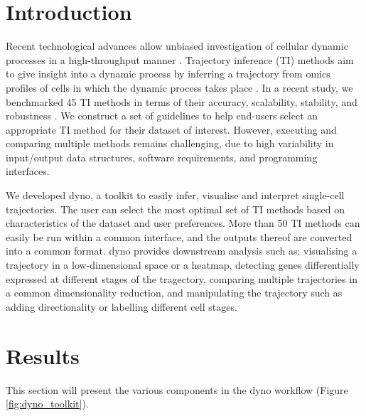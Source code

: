 
\section{Introduction}

Recent technological advances allow unbiased investigation of cellular
dynamic processes in a high-throughput manner
 \cite{tanay_scalingsinglecellgenomics_2017,etzrodt_quantitativesinglecellapproaches_2014}.
Trajectory inference (TI) methods aim to give insight into a dynamic
process by inferring a trajectory from omics profiles of cells in which
the dynamic process takes place
 \cite{cannoodt_computationalmethodstrajectory_2016}. In a recent study,
we benchmarked 45 TI methods in terms of their accuracy, scalability,
stability, and
robustness \cite{saelens_comparisonsinglecelltrajectory_2019}. We
construct a set of guidelines to help end-users select an appropriate TI
method for their dataset of interest. However, executing and comparing
multiple methods remains challenging, due to high variability in
input/output data structures, software requirements, and programming
interfaces.

We developed {dyno}, a toolkit to easily infer, visualise and
interpret single-cell trajectories. The user can select the most optimal
set of TI methods based on characteristics of the dataset and user
preferences. More than 50 TI methods can easily be run within a common
interface, and the outputs thereof are converted into a common format.
{dyno} provides downstream analysis such as: visualising a
trajectory in a low-dimensional space or a heatmap, detecting genes
differentially expressed at different stages of the tragectory,
comparing multiple trajectories in a common dimensionality reduction,
and manipulating the trajectory such as adding directionality or
labelling different cell stages.

\section{Results}
This section will present the various components in the {dyno} workflow (Figure \ref{fig:dyno_toolkit}).

